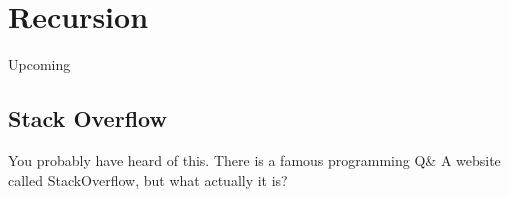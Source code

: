 \documentclass[../main.tex]{subfiles}
\begin{document}
    \section{Recursion}
    Upcoming
    \subsection{Stack Overflow}
    You probably have heard of this. There is a famous programming Q\& A website
    called StackOverflow, but what actually it is?
\end{document}
